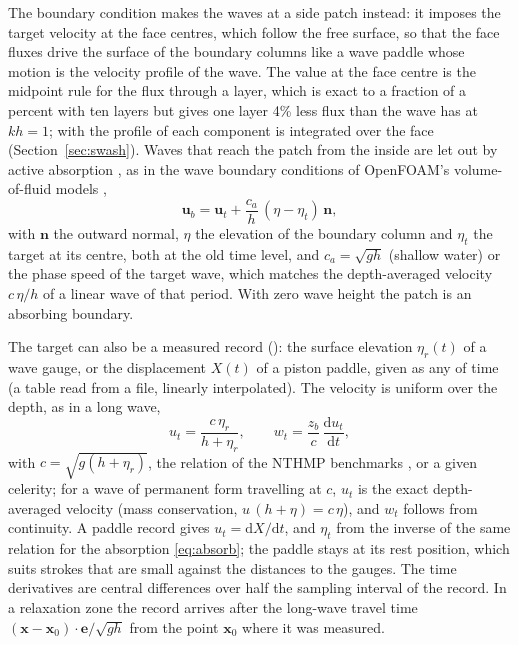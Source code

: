 The boundary condition  makes the waves at a side patch
instead: it imposes the target velocity at the face centres, which follow
the free surface, so that the face fluxes drive the surface of the boundary
columns like a wave paddle whose motion is the velocity profile of the wave.
The value at the face centre is the midpoint rule for the flux through a
layer, which is exact to a fraction of a percent with ten layers but gives
one layer 4\% less flux than the wave has at $kh = 1$; with
 the profile of each component is integrated over
the face (Section~\ref{sec:swash}).
Waves that reach the patch from the inside are let out by active absorption
\citep{schaffer2000}, as in the wave boundary conditions of OpenFOAM's
volume-of-fluid models \citep{higuera2013},
\begin{equation}
  \bm{u}_b = \bm{u}_t + \frac{c_a}{h}\,(\eta - \eta_t)\,\bm{n},
  \label{eq:absorb}
\end{equation}
with $\bm{n}$ the outward normal, $\eta$ the elevation of the boundary
column and $\eta_t$ the target at its centre, both at the old time level, and
$c_a = \sqrt{gh}$ (shallow water) or the phase speed of the target wave,
which matches the depth-averaged velocity $c\,\eta/h$ of a linear wave of
that period. With zero wave height the patch is an absorbing boundary.

The target can also be a measured record (): the
surface elevation $\eta_r(t)$ of a wave gauge, or the displacement $X(t)$ of a
piston paddle, given as any  of time (a table read from a
file, linearly interpolated). The velocity is uniform over the depth, as in
a long wave,
\begin{equation}
  u_t = \frac{c\,\eta_r}{h + \eta_r},\qquad
  w_t = \frac{z_b}{c}\,\frac{\mathrm{d}u_t}{\mathrm{d}t},
  \label{eq:timeseries}
\end{equation}
with $c = \sqrt{g(h+\eta_r)}$, the relation of the NTHMP benchmarks
\citep{synolakis2008}, or a given celerity; for a wave of permanent form
travelling at $c$, $u_t$ is the exact depth-averaged velocity (mass
conservation, $u\,(h+\eta) = c\,\eta$), and $w_t$ follows from continuity.
A paddle record gives $u_t = \mathrm{d}X/\mathrm{d}t$, and $\eta_t$ from the
inverse of the same relation for the absorption \eqref{eq:absorb}; the
paddle stays at its rest position, which suits strokes that are small
against the distances to the gauges. The time derivatives are central
differences over half the sampling interval of the record. In a relaxation
zone the record arrives after the long-wave travel time
$(\bm{x}-\bm{x}_0)\cdot\bm{e}/\sqrt{gh}$ from the point $\bm{x}_0$ where it
was measured.

